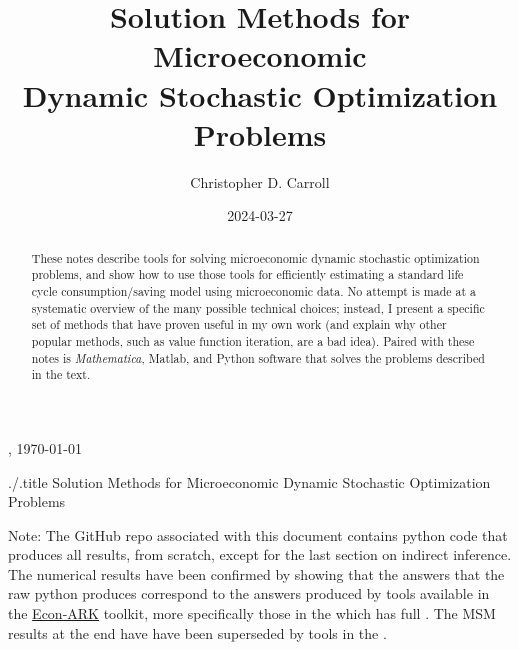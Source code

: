 \documentclass[titlepage, headings=optiontotocandhead]{\econtex}
\begin{document}
  \renewcommand{\onlyinsubfile}[1]{}\renewcommand{\notinsubfile}[1]{#1}

  \hfill{\tiny \jobname, \today}

  \begin{verbatimwrite}{./\texname.title}
    Solution Methods for Microeconomic Dynamic Stochastic Optimization Problems
  \end{verbatimwrite}

  \title{Solution Methods for Microeconomic \\ Dynamic Stochastic Optimization Problems}

  \author{Christopher D. Carroll\authNum}


  \date{2024-03-27}
  \maketitle
  \footnotesize

  \noindent  Note: The GitHub repo {\SMDSOPrepo} associated with this document contains python code that produces all results, from scratch, except for the last section on indirect inference.  The numerical results have been confirmed by showing that the answers that the raw python produces correspond to the answers produced by tools available in the \href{https://econ-ark.org}{Econ-ARK} toolkit, more specifically those in the {\HARKrepo} which has full {\HARKdocs}.  The MSM results at the end have have been superseded by tools in the {\EMDSOPrepo}.

  \normalsize

  \hypertarget{Abstract}{}
  \begin{abstract}
    These notes describe tools for solving microeconomic dynamic stochastic optimization problems, and show how to use those tools for efficiently estimating a standard life cycle consumption/saving model using microeconomic data.  No attempt is made at a systematic overview of the many possible technical choices; instead, I present a specific set of methods that have proven useful in my own work (and explain why other popular methods, such as value function iteration, are a bad idea).  Paired with these notes is \textit{Mathematica}, Matlab, and Python software that solves the problems described in the text.
  \end{abstract}
\end{document}
